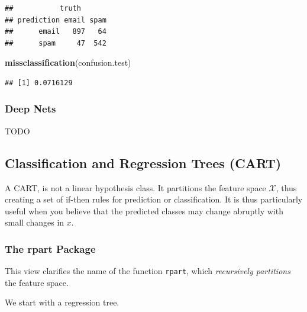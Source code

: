 \documentclass[]{book}
\newenvironment{Shaded}{\begin{snugshade}}{\end{snugshade}}
\newcommand{\KeywordTok}[1]{\textcolor[rgb]{0.13,0.29,0.53}{\textbf{#1}}}
\newcommand{\DataTypeTok}[1]{\textcolor[rgb]{0.13,0.29,0.53}{#1}}
\newcommand{\DecValTok}[1]{\textcolor[rgb]{0.00,0.00,0.81}{#1}}
\newcommand{\StringTok}[1]{\textcolor[rgb]{0.31,0.60,0.02}{#1}}
\newcommand{\CommentTok}[1]{\textcolor[rgb]{0.56,0.35,0.01}{\textit{#1}}}
\newcommand{\OperatorTok}[1]{\textcolor[rgb]{0.81,0.36,0.00}{\textbf{#1}}}
\newcommand{\NormalTok}[1]{#1}
\theoremstyle{definition}
\theoremstyle{definition}
\theoremstyle{definition}
\theoremstyle{remark}
\begin{document}
\begin{verbatim}
##           truth
## prediction email spam
##      email   897   64
##      spam     47  542
\end{verbatim}

\begin{Shaded}
\begin{Highlighting}[]
\KeywordTok{missclassification}\NormalTok{(confusion.test)}
\end{Highlighting}
\end{Shaded}

\begin{verbatim}
## [1] 0.0716129
\end{verbatim}

\subsubsection{Deep Nets}\label{deep-nets}

TODO

\subsection{Classification and Regression Trees
(CART)}\label{classification-and-regression-trees-cart}

A CART, is not a linear hypothesis class. It partitions the feature
space \(\mathcal{X}\), thus creating a set of if-then rules for
prediction or classification. It is thus particularly useful when you
believe that the predicted classes may change abruptly with small
changes in \(x\).

\subsubsection{The rpart Package}\label{the-rpart-package}

This view clarifies the name of the function \texttt{rpart}, which
\emph{recursively partitions} the feature space.

We start with a regression tree.

\begin{Shaded}
\end{Shaded}
\end{document}
